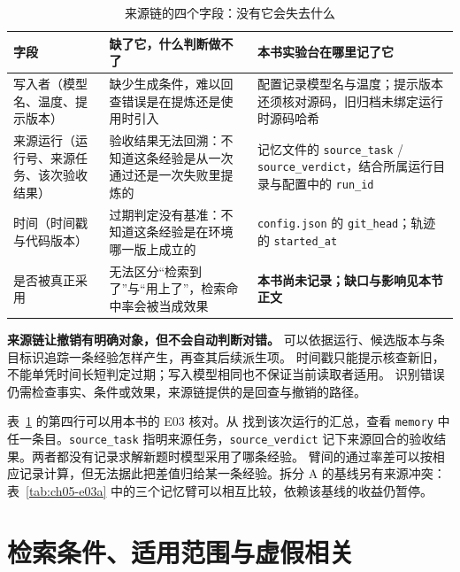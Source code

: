 \begin{table}[htbp]
\centering
\caption{来源链的四个字段：没有它会失去什么}
\label{tab:ch05-provenance}
\begin{tabular}{>{\raggedright\arraybackslash}p{3.0cm}>{\raggedright\arraybackslash}p{5.2cm}>{\raggedright\arraybackslash}p{4.4cm}}
\toprule
字段 & 缺了它，什么判断做不了 & 本书实验台在哪里记了它 \\
\midrule
写入者（模型名、温度、提示版本） & 缺少生成条件，难以回查错误是在提炼还是使用时引入 & 配置记录模型名与温度；提示版本还须核对源码，旧归档未绑定运行时源码哈希 \\
来源运行（运行号、来源任务、该次验收结果） & 验收结果无法回溯：不知道这条经验是从一次通过还是一次失败里提炼的 & 记忆文件的 \texttt{source\_task} / \texttt{source\_verdict}，结合所属运行目录与配置中的 \texttt{run\_id} \\
时间（时间戳与代码版本） & 过期判定没有基准：不知道这条经验是在环境哪一版上成立的 & \texttt{config.json} 的 \texttt{git\_head}；轨迹的 \texttt{started\_at} \\
是否被真正采用 & 无法区分``检索到了''与``用上了''，检索命中率会被当成效果 & \textbf{本书尚未记录；缺口与影响见本节正文} \\
\bottomrule
\end{tabular}
\end{table}

\begin{principlebox}
\textbf{来源链让撤销有明确对象，但不会自动判断对错。}
可以依据运行、候选版本与条目标识追踪一条经验怎样产生，再查其后续派生项。
时间戳只能提示核查新旧，不能单凭时间长短判定过期；写入模型相同也不保证当前读取者适用。
识别错误仍需检查事实、条件或效果，来源链提供的是回查与撤销的路径。

\end{principlebox}

\begin{sloppypar}
表~\ref{tab:ch05-provenance} 的第四行可以用本书的 E03 核对。从  找到该次运行的汇总，查看 \texttt{memory} 中任一条目。\texttt{source\_task} 指明来源任务，\texttt{source\_verdict} 记下来源回合的验收结果。两者都没有记录求解新题时模型采用了哪条经验。
臂间的通过率差可以按相应记录计算，但无法据此把差值归给某一条经验。拆分 A 的基线另有来源冲突：表~\ref{tab:ch05-e03a} 中的三个记忆臂可以相互比较，依赖该基线的收益仍暂停。
\end{sloppypar}

\section{检索条件、适用范围与虚假相关}
\label{sec:ch05-retrieve}


